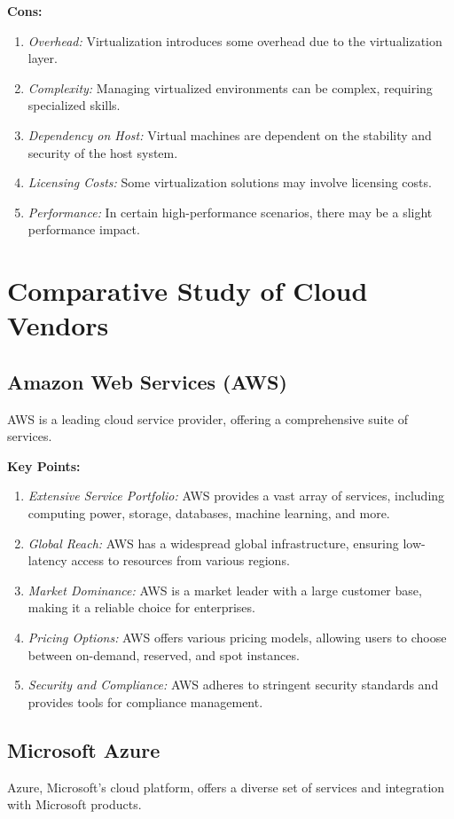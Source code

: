 \documentclass[11pt]{article}
\begin{document}
\textbf{Cons:}
\begin{enumerate}
    \item \textit{Overhead:} Virtualization introduces some overhead due to the virtualization layer.
    \item \textit{Complexity:} Managing virtualized environments can be complex, requiring specialized skills.
    \item \textit{Dependency on Host:} Virtual machines are dependent on the stability and security of the host system.
    \item \textit{Licensing Costs:} Some virtualization solutions may involve licensing costs.
    \item \textit{Performance:} In certain high-performance scenarios, there may be a slight performance impact.
\end{enumerate}

\section{Comparative Study of Cloud Vendors}

\subsection{Amazon Web Services (AWS)}
AWS is a leading cloud service provider, offering a comprehensive suite of services.

\textbf{Key Points:}
\begin{enumerate}
    \item \textit{Extensive Service Portfolio:} AWS provides a vast array of services, including computing power, storage, databases, machine learning, and more.
    \item \textit{Global Reach:} AWS has a widespread global infrastructure, ensuring low-latency access to resources from various regions.
    \item \textit{Market Dominance:} AWS is a market leader with a large customer base, making it a reliable choice for enterprises.
    \item \textit{Pricing Options:} AWS offers various pricing models, allowing users to choose between on-demand, reserved, and spot instances.
    \item \textit{Security and Compliance:} AWS adheres to stringent security standards and provides tools for compliance management.
\end{enumerate}

\subsection{Microsoft Azure}
Azure, Microsoft's cloud platform, offers a diverse set of services and integration with Microsoft products.
\end{document}
